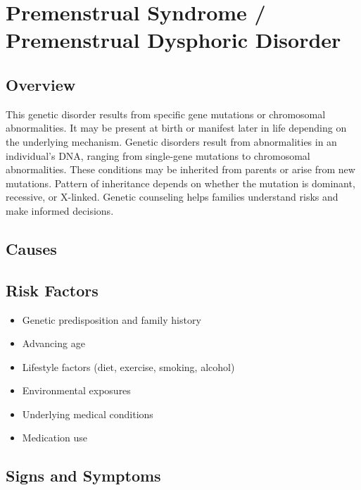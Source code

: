 \chapter{Premenstrual Syndrome / Premenstrual Dysphoric Disorder}
\label{sec:PMS PMDD}

\section{Overview}
This genetic disorder results from specific gene mutations or chromosomal abnormalities. It may be present at birth or manifest later in life depending on the underlying mechanism. Genetic disorders result from abnormalities in an individual's DNA, ranging from single-gene mutations to chromosomal abnormalities. These conditions may be inherited from parents or arise from new mutations. Pattern of inheritance depends on whether the mutation is dominant, recessive, or X-linked. Genetic counseling helps families understand risks and make informed decisions.
\section{Causes}
\section{Risk Factors}

\begin{itemize}[noitemsep]
  \item Genetic predisposition and family history
  \item Advancing age
  \item Lifestyle factors (diet, exercise, smoking, alcohol)
  \item Environmental exposures
  \item Underlying medical conditions
  \item Medication use
\end{itemize}
\section{Signs and Symptoms}

